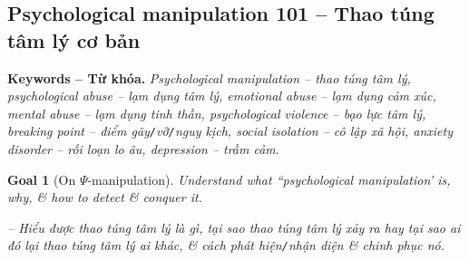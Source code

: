 \documentclass[12pt]{article}
\newtheorem{goal}{Goal}
\begin{document}
\subsection{Psychological manipulation 101 -- Thao túng tâm lý cơ bản}
\label{sect: psychological manipulation}
{\bf Keywords -- Từ khóa.} {\it Psychological manipulation -- thao túng tâm lý, psychological abuse -- lạm dụng tâm lý, emotional abuse -- lạm dụng cảm xúc, mental abuse -- lạm dụng tinh thần,  psychological violence -- bạo lực tâm lý, breaking point -- điểm gãy{\tt/}vỡ{\tt/}nguy kịch, social isolation -- cô lập xã hội, anxiety disorder -- rối loạn lo âu, depression -- trầm cảm}.

\begin{goal}[On $\Psi$-manipulation]
	Understand what ``psychological manipulation' is, why, \& how to detect \& conquer it.
	
	-- Hiểu được thao túng tâm lý là gì, tại sao thao túng tâm lý xảy ra hay tại sao ai đó lại thao túng tâm lý ai khác, \& cách phát hiện{\tt/}nhận diện \& chinh phục nó.
\end{goal}
\end{document}
